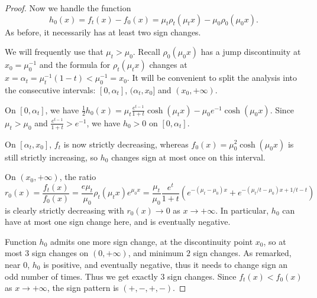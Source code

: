 \documentclass[10pt,a4paper]{amsart}
\newcommand{\red}{}
\begin{document}
\begin{proof}
Now we handle the function
\[
h_0(x) = f_t(x) - f_0(x) = \mu_t\rho_t(\mu_tx) - \mu_0\rho_0(\mu_0x).
\]
As before, it necessarily has at least two sign changes.

We will frequently use that $\mu_t > \mu_0$. Recall $\rho_0(\mu_0x)$ has a jump discontinuity at $x_0 = \mu_0^{-1}$ and the formula for $\rho_t(\mu_tx)$ changes at $x = \alpha_t = \mu_t^{-1}(1-t) < \mu_0^{-1} = x_0$. It will be convenient to split the analysis into the consecutive intervals: $[0, \alpha_t]$, $(\alpha_t, x_0]$ and $(x_0,+ \infty)$.

On $[0, \alpha_t]$, we have $\frac12 h_0(x) = \mu_t\frac{e^{t-1}}{1+t}\cosh(\mu_tx) - \mu_0e^{-1}\cosh(\mu_0x)$. Since $\mu_t > \mu_0$ and $\frac{e^{t-1}}{1+t} > e^{-1}$, we have $h_0 > 0$ on $[0, \alpha_t]$.

On $[\alpha_t, x_0]$, $f_t$ is now strictly decreasing, whereas $f_0(x) = \mu_0^2\cosh(\mu_0 x)$ is still strictly increasing, so $h_0$ changes sign at most once on this interval.

On $(x_0, {+\infty})$, the ratio 
\[
r_0(x) = \frac{f_t(x)}{f_0(x)} = \frac{e\mu_t}{\mu_0}\rho_t(\mu_tx)e^{\mu_0x} = \frac{\mu_t}{\mu_0}\frac{e^t}{1+t}\left(e^{-(\mu_t-\mu_0)x} +e^{-(\mu_t/t-\mu_0)x + 1/t-t} \right)
\]
is clearly strictly decreasing with $r_0(x) \to 0$ as $x \to {+\infty}$. In particular, $h_0$ can have at most one sign change here, and is eventually negative. 

Function $h_0$ admits one more sign change, at the discontinuity point $x_0$, so at most $3$ sign changes on $(0, {+\infty})$, and minimum $2$ sign changes. As remarked, near $0$, $h_0$ is positive, and eventually negative, thus it {\red needs to} change sign an odd number of times. Thus we get exactly $3$ sign changes. Since $f_t(x) < f_0(x)$ as $x \to {+\infty}$, the sign pattern is $(+,-,+,-)$.

\end{proof}
\end{document}
